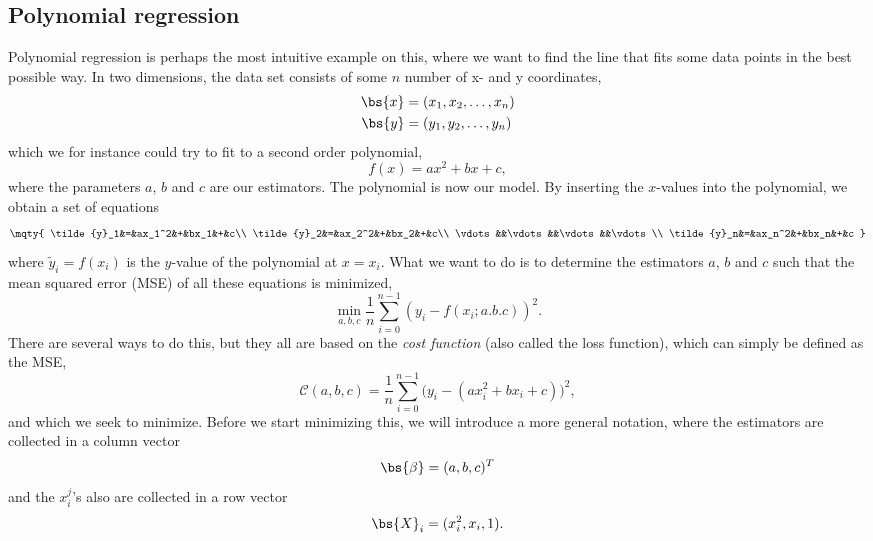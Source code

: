 \subsection{Polynomial regression}
Polynomial regression is perhaps the most intuitive example on this, where we want to find the line that fits some data points in the best possible way. In two dimensions, the data set consists of some $n$ number of x- and y coordinates,
\begin{align*}
\bs{x}&=(x_1,x_2,\hdots,x_n)\\
\bs{y}&=(y_1,y_2,\hdots,y_n)
\end{align*}
which we for instance could try to fit to a second order polynomial,
\begin{equation}
f(x)=ax^2+bx+c,
\end{equation}
where the parameters $a$, $b$ and $c$ are our estimators. The polynomial is now our model. By inserting the $x$-values into the polynomial, we obtain a set of equations
\begin{equation}
\mqty{
	\tilde{y}_1&=&ax_1^2&+&bx_1&+&c\\
	\tilde{y}_2&=&ax_2^2&+&bx_2&+&c\\
	\vdots&&\vdots&&\vdots&&\vdots\\
	\tilde{y}_n&=&ax_n^2&+&bx_n&+&c
}
\label{eq:lineareqs}
\end{equation}
where $\tilde{y}_i=f(x_i)$ is the $y$-value of the polynomial at $x=x_i$. What we want to do is to determine the estimators $a$, $b$ and $c$ such that the mean squared error (MSE) of all these equations is minimized,
\begin{equation}
\min_{a,b,c}\frac{1}{n}\sum_{i=0}^{n-1}(y_i-f(x_i;a.b.c))^2.
\end{equation}
There are several ways to do this, but they all are based on the \textit{cost function} (also called the loss function), which can simply be defined as the MSE,
\begin{equation}
\mathcal{C}(a,b,c)=\frac{1}{n}\sum_{i=0}^{n-1}\Big(y_i-(ax_i^2+bx_i+c)\Big)^2,
\end{equation}
and which we seek to minimize. Before we start minimizing this, we will introduce a more general notation, where the estimators are collected in a column vector 
\begin{equation*}
\bs{\beta}=(a,b,c)^T
\end{equation*}
and the $x_i^j$'s also are collected in a row vector
\begin{equation*}
\bs{X}_i=(x_i^2, x_i, 1).
\end{equation*}
